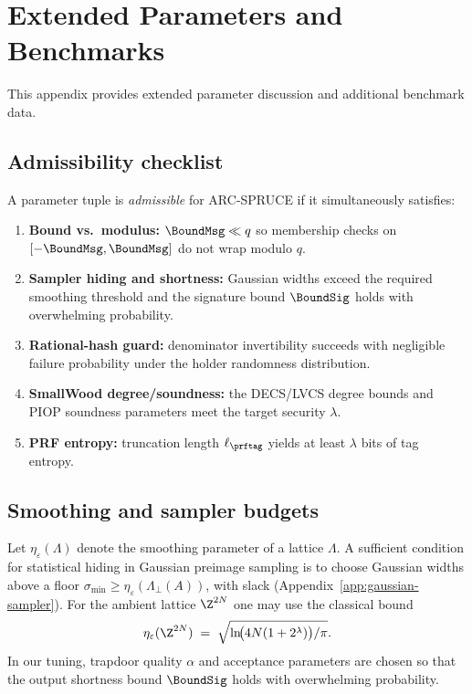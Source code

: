 \section{Extended Parameters and Benchmarks}
\label{app:ext-params}

This appendix provides extended parameter discussion and additional benchmark data.

\subsection{Admissibility checklist}
A parameter tuple is \emph{admissible} for ARC-SPRUCE if it simultaneously satisfies:
\begin{enumerate}[leftmargin=1.25em]
  \item \textbf{Bound vs.\ modulus:} \(\BoundMsg \ll q\) so membership checks on \([-\BoundMsg,\BoundMsg]\) do not wrap modulo \(q\).
  \item \textbf{Sampler hiding and shortness:} Gaussian widths exceed the required smoothing threshold and the signature
  bound \(\BoundSig\) holds with overwhelming probability.
  \item \textbf{Rational-hash guard:} denominator invertibility succeeds with negligible failure probability under the
  holder randomness distribution.
  \item \textbf{SmallWood degree/soundness:} the DECS/LVCS degree bounds and PIOP soundness parameters meet the target
  security \(\lambda\).
  \item \textbf{PRF entropy:} truncation length \(\ell_{\prftag}\) yields at least \(\lambda\) bits of tag entropy.
\end{enumerate}

\subsection{Smoothing and sampler budgets}
Let \(\eta_\varepsilon(\Lambda)\) denote the smoothing parameter of a lattice \(\Lambda\). A sufficient condition for
statistical hiding in Gaussian preimage sampling is to choose Gaussian widths above a floor
\(\sigma_{\min}\ge \eta_\varepsilon(\Lambda_\perp(A))\), with slack (Appendix~\ref{app:gaussian-sampler}).
For the ambient lattice \(\Z^{2N}\) one may use the classical bound
\[
  \eta_\varepsilon(\Z^{2N})
  \;=\;
  \sqrt{\ln\!\bigl(4N(1+2^\lambda)\bigr)/\pi}.
\]
In our tuning, trapdoor quality \(\alpha\) and acceptance parameters are chosen so that the output shortness bound
\(\BoundSig\) holds with overwhelming probability.

